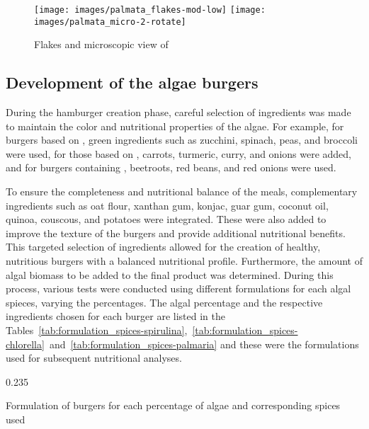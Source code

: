\begin{figure}[H]
\centering
	\subcaptionbox*{\label{subfig:palmaria_flakes}}%
		{\texttt{[image: images/palmata\_flakes-mod-low]}}%
\hfill
	\subcaptionbox*{\label{subfig:palmaria_micro}}%
		{\texttt{[image: images/palmata\_micro-2-rotate]}}%
\caption{Flakes and microscopic view of }%
\label{fig:palmaria_views}
\end{figure}


\subsection{Development of the algae burgers}
During the hamburger creation phase, careful selection of ingredients was made to maintain the color and nutritional properties of the algae. For example, for burgers based on , green ingredients such as zucchini, spinach, peas, and broccoli were used, for those based on , carrots, turmeric, curry, and onions were added, and for burgers containing , beetroots, red beans, and red onions were used.

To ensure the completeness and nutritional balance of the meals, complementary ingredients such as oat flour, xanthan gum, konjac, guar gum, coconut oil, quinoa, couscous, and potatoes were integrated. These were also added to improve the texture of the burgers and provide additional nutritional benefits. This targeted selection of ingredients allowed for the creation of healthy, nutritious burgers with a balanced nutritional profile. Furthermore, the amount of algal biomass to be added to the final product was determined. During this process, various tests were conducted using different formulations for each algal spieces, varying the percentages. The algal percentage and the respective ingredients chosen for each burger are listed in the Tables~\ref{tab:formulation_spices-spirulina},~\ref{tab:formulation_spices-chlorella}~and~\ref{tab:formulation_spices-palmaria} and these were the formulations used for subsequent nutritional analyses.

\begin{table}[H]
\footnotesize
\centering
	\begin{subcaptionblock}{0.68\textwidth}
	\centering
	\end{subcaptionblock}%
\hspace*{\hbtwsfig}%
	\begin{subcaptionblock}[][18.91em][c]{0.235\textwidth}
	\centering
	\end{subcaptionblock}%
\caption{Formulation of  burgers for each percentage of algae and corresponding spices used}
\label{tab:formulation_spices-spirulina}
\end{table}

